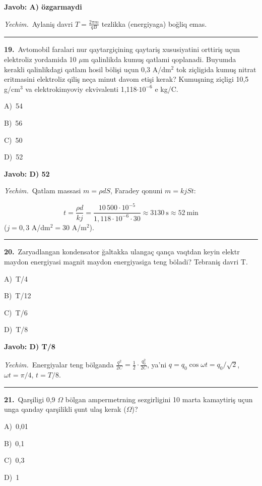 \documentclass[11pt,a4paper]{article}
\newcommand{\opt}[2]{\hspace*{4mm}#1)\ #2\par}
\begin{document}
\noindent\colorbox{gray!12}{\parbox{\dimexpr\linewidth-2\fboxsep}{\textbf{Javob: A) özgarmaydi}}}\par\smallskip
\noindent\textit{Yechim.}\ Aylaniş davri $T=\frac{2\pi m}{qB}$ tezlikka (energiyaga) boğliq emas.\par\par\medskip\hrule\medskip
{}\noindent\begin{minipage}{\linewidth}
\textbf{19.}\ Avtomobil faralari nur qaytargiçining qaytariş xususiyatini orttiriş uçun elektroliz yordamida 10 $\mu$m qalinlikda kumuş qatlami qoplanadi. Buyumda kerakli qalinlikdagi qatlam hosil bölişi uçun 0,3 A/dm$^{2}$ tok ziçligida kumuş nitrat eritmasini elektroliz qiliş neça minut davom etişi kerak? Kumuşning ziçligi 10,5 g/cm$^{3}$ va elektrokimyoviy ekvivalenti 1,118$\cdot10^{-6}$ e kg/C.\par\smallskip
\opt{A}{54}
\opt{B}{56}
\opt{C}{50}
\opt{D}{52}
\end{minipage}\vspace{2pt}\par
\noindent\colorbox{gray!12}{\parbox{\dimexpr\linewidth-2\fboxsep}{\textbf{Javob: D) 52}}}\par\smallskip
\noindent\textit{Yechim.}\ Qatlam massasi $m=\rho dS$, Faradey qonuni $m=kjSt$:\par
\[t=\frac{\rho d}{kj}=\frac{10\,500\cdot10^{-5}}{1{,}118\cdot10^{-6}\cdot30}\approx3130\ \text{s}\approx52\ \text{min}\]
($j=0{,}3$ A/dm$^2=30$ A/m$^2$).\par\par\medskip\hrule\medskip
{}\noindent\begin{minipage}{\linewidth}
\textbf{20.}\ Zaryadlangan kondensator ğaltakka ulangaç qança vaqtdan keyin elektr maydon energiyasi magnit maydon energiyasiga teng böladi? Tebraniş davri T.\par\smallskip
\opt{A}{T/4}
\opt{B}{T/12}
\opt{C}{T/6}
\opt{D}{T/8}
\end{minipage}\vspace{2pt}\par
\noindent\colorbox{gray!12}{\parbox{\dimexpr\linewidth-2\fboxsep}{\textbf{Javob: D) T/8}}}\par\smallskip
\noindent\textit{Yechim.}\ Energiyalar teng bölganda $\frac{q^2}{2C}=\frac12\cdot\frac{q_0^2}{2C}$, ya’ni $q=q_0\cos\omega t=q_0/\sqrt2$, $\omega t=\pi/4$, $t=T/8$.\par\par\medskip\hrule\medskip
{}\noindent\begin{minipage}{\linewidth}
\textbf{21.}\ Qarşiligi 0,9 $\Omega$ bölgan ampermetrning sezgirligini 10 marta kamaytiriş uçun unga qanday qarşilikli şunt ulaş kerak ($\Omega$)?\par\smallskip
\opt{A}{0,01}
\opt{B}{0,1}
\opt{C}{0,3}
\opt{D}{1}
\end{minipage}\vspace{2pt}\par
\end{document}
